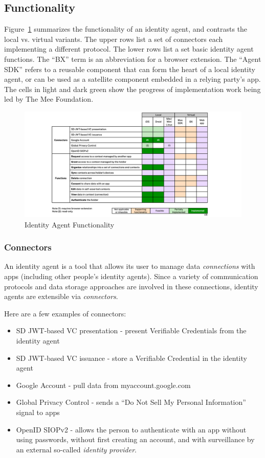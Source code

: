 \documentclass[11pt, oneside]{article}   	%
\begin{document}
\subsection{Functionality}

Figure~\ref{fig:functionality} summarizes the functionality of an identity agent, and contrasts the local vs. virtual variants. The upper rows list a set of connectors each implementing a different protocol. The lower rows list a set basic identity agent functions. The ``BX'' term is an abbreviation for a browser extension. The ``Agent SDK'' refers to a reusable component that can form the heart of a local identity agent, or can be used as a satellite component embedded in a relying party's app. The cells in light and dark green show the progress of implementation work being led by The Mee Foundation. 

\begin{figure}[htbp]
\includegraphics[width=\textwidth]{./images/identity-agent-functionality.png}
\caption{Identity Agent Functionality}
\label{fig:functionality}
\end{figure}

\subsubsection{Connectors}

An identity agent is a tool that allows its user to manage data \emph{connections} with apps (including other people's identity agents). Since a variety of communication protocols and data storage approaches are involved in these connections, identity agents are extensible via \emph{connectors}. 

Here are a few examples of connectors:
\begin{itemize}
\item SD JWT-based VC presentation - present Verifiable Credentials from the identity agent
\item SD JWT-based VC issuance - store a Verifiable Credential in the identity agent
\item Google Account - pull data from myaccount.google.com 
\item Global Privacy Control - sends a ``Do Not Sell My Personal Information'' signal to apps
\item OpenID SIOPv2 - allows the person to authenticate with an app without using passwords, without first creating an account, and with surveillance by an external so-called \emph{identity provider}.
\end{itemize}
\end{document}
